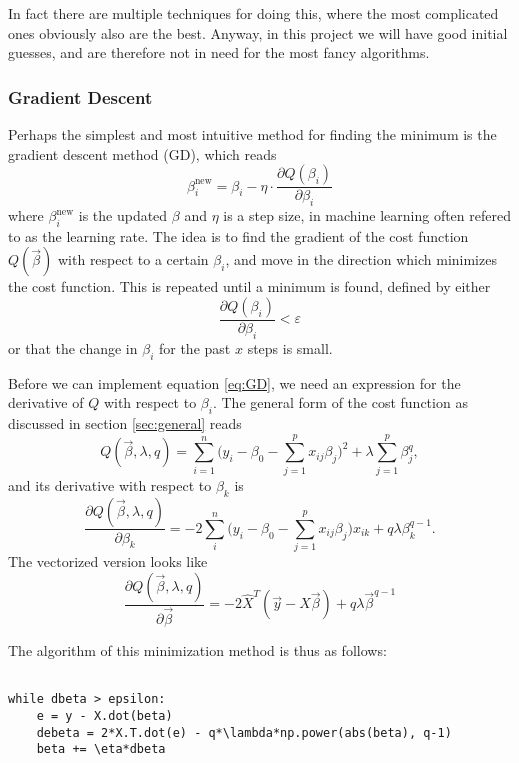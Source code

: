 In fact there are multiple techniques for doing this, where the most complicated ones obviously also are the best. Anyway, in this project we will have good initial guesses, and are therefore not in need for the most fancy algorithms. 

\subsubsection{Gradient Descent} \label{sec:gd}
Perhaps the simplest and most intuitive method for finding the minimum is the gradient descent method (GD), which reads
\begin{equation}
\label{eq:GD}
\beta_i^{\text{new}}=\beta_i - \eta\cdot\frac{\partial Q(\beta_i)}{\partial\beta_i}
\end{equation}
where $\beta_i^{\text{new}}$ is the updated $\beta$ and $\eta$ is a step size, in machine learning often refered to as the learning rate. The idea is to find the gradient of the cost function $Q(\vec{\beta})$ with respect to a certain $\beta_i$, and move in the direction which minimizes the cost function. This is repeated until a minimum is found, defined by either
\begin{equation}
\frac{\partial Q(\beta_i)}{\partial\beta_i}<\varepsilon
\end{equation}
or that the change in $\beta_i$ for the past $x$ steps is small. 
\par 
\vspace{3mm}

Before we can implement equation \eqref{eq:GD}, we need an expression for the derivative of $Q$ with respect to $\beta_i$. The general form of the cost function as discussed in section \ref{sec:general} reads
\begin{equation}
Q(\vec{\beta},\lambda,q)=\sum_{i=1}^{n}\Big(y_i-\beta_0-\sum_{j=1}^px_{ij}\beta_j\Big)^2+\lambda\sum_{j=1}^p\beta_j^q,
\label{eq:cost_gen}
\end{equation}
and its derivative with respect to $\beta_k$ is
\begin{equation}
\frac{\partial Q(\vec{\beta},\lambda,q)}{\partial\beta_k}=-2\sum_i^n\Big(y_i-\beta_0-\sum_{j=1}^px_{ij}\beta_j\Big)x_{ik}+q\lambda\beta_k^{q-1}.
\label{eq:der_cost_gen}
\end{equation}
The vectorized version looks like
\begin{equation}
\frac{\partial Q(\vec{\beta},\lambda,q)}{\partial\vec{\beta}}=-2\hat{X}^T(\vec{y}-\hat{X}\vec{\beta})+q\lambda\vec{\beta}^{q-1}
\label{eq:der_cost_gen_vec}
\end{equation}

The algorithm of this minimization method is thus as follows:

\lstset{basicstyle=\scriptsize}
\begin{lstlisting}

while dbeta > epsilon:
	e = y - X.dot(beta)
    debeta = 2*X.T.dot(e) - q*\lambda*np.power(abs(beta), q-1)
    beta += \eta*dbeta


\end{lstlisting}